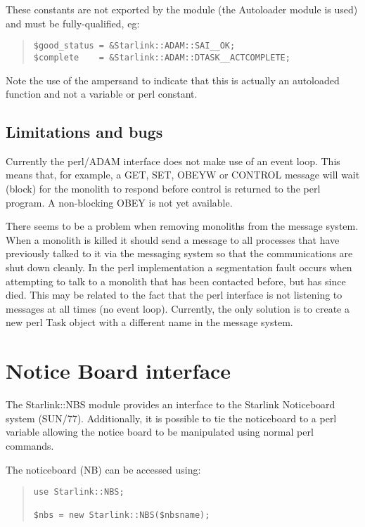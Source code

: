 \documentclass[twoside,11pt]{article}
\newenvironment{myquote}{\begin{quote}\begin{small}}{\end{small}\end{quote}}
\newcommand{\xref}[3]{#1}
\renewcommand{\_}{\texttt{\symbol{95}}}
\begin{document}
These constants are not exported by the module (the Autoloader module is used) 
and must be fully-qualified, eg:

\begin{myquote}
\begin{verbatim}
$good_status = &Starlink::ADAM::SAI__OK;
$complete    = &Starlink::ADAM::DTASK__ACTCOMPLETE;
\end{verbatim}
\end{myquote}

Note the use of the ampersand to indicate that this is actually an
autoloaded function and not a variable or perl constant.

\subsection{Limitations and bugs}

Currently the perl/ADAM interface does not make use of an event loop.
This means that, for example, a GET, SET, OBEYW or CONTROL message will
wait (block) for the monolith to respond before control is returned
to the perl program. A non-blocking OBEY is not yet available.

There seems to be a problem when removing monoliths from the message
system. When a monolith is killed it should send a message to
all processes that have previously talked to it via the messaging
system so that the communications are shut down cleanly. In the perl
implementation a segmentation fault occurs when attempting to talk
to a monolith that has been contacted before, but has since died.
This may be related to the fact that the perl interface is not
listening to messages at all times (no event loop). Currently, the
only solution is to create a new perl Task object with a different
name in the message system.

\section{Notice Board interface}

The Starlink::NBS module provides an interface to the Starlink
Noticeboard system (\xref{SUN/77}{sun77}{}). Additionally, it is possible
to tie the noticeboard to a perl variable allowing the notice board
to be manipulated using normal perl commands.

The noticeboard (NB) can be accessed using:

\begin{myquote}
\begin{verbatim}
use Starlink::NBS;

$nbs = new Starlink::NBS($nbsname);
\end{verbatim}
\end{myquote}
\end{document}
